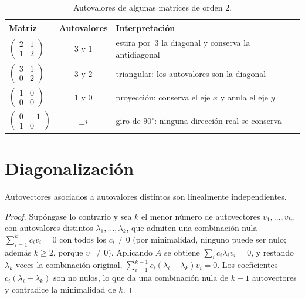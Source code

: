 \begin{table}[h]
\centering\small
\caption{Autovalores de algunas matrices de orden 2.}\label{tab:autovalores}
\begin{tabular}{@{}lcl@{}}
\toprule
Matriz & Autovalores & Interpretación \\
\midrule
$\begin{pmatrix}2&1\\1&2\end{pmatrix}$ & $3$ y $1$ & estira por~3 la diagonal y conserva la antidiagonal \\[6pt]
$\begin{pmatrix}3&1\\0&2\end{pmatrix}$ & $3$ y $2$ & triangular: los autovalores son la diagonal \\[6pt]
$\begin{pmatrix}1&0\\0&0\end{pmatrix}$ & $1$ y $0$ & proyección: conserva el eje $x$ y anula el eje $y$ \\[6pt]
$\begin{pmatrix}0&-1\\1&0\end{pmatrix}$ & $\pm i$ & giro de $90^{\circ}$: ninguna dirección real se conserva \\
\bottomrule
\end{tabular}
\end{table}

\section{Diagonalización}

\begin{proposicion}\label{prop:indep-autovectores}
Autovectores asociados a autovalores distintos son linealmente independientes.
\end{proposicion}

\begin{proof}
Supóngase lo contrario y sea $k$ el menor número de autovectores $v_1,\dots,v_k$, con autovalores distintos $\lambda_1,\dots,\lambda_k$, que admiten una combinación nula $\sum_{i=1}^{k}c_iv_i=0$ con todos los $c_i\ne 0$ (por minimalidad, ninguno puede ser nulo; además $k\ge 2$, porque $v_1\ne 0$). Aplicando $A$ se obtiene $\sum_i c_i\lambda_iv_i=0$, y restando $\lambda_k$ veces la combinación original, $\sum_{i=1}^{k-1}c_i(\lambda_i-\lambda_k)v_i=0$. Los coeficientes $c_i(\lambda_i-\lambda_k)$ son no nulos, lo que da una combinación nula de $k-1$ autovectores y contradice la minimalidad de $k$.
\end{proof}

